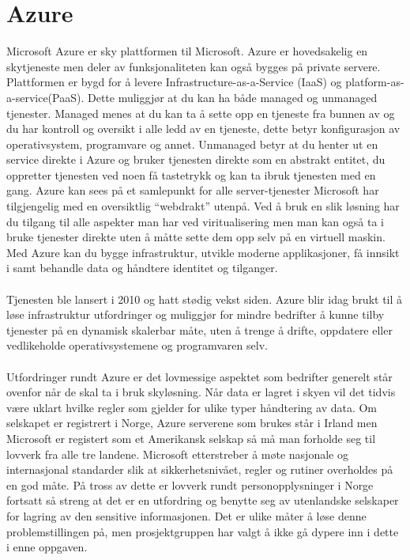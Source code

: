 \section{Azure}
\label{sec:teoridel_azure}
Microsoft Azure er sky plattformen til Microsoft. Azure er hovedsakelig en skytjeneste men deler av funksjonaliteten kan også bygges på private servere. Plattformen er bygd for å levere Infrastructure-as-a-Service (IaaS) og platform-as-a-service(PaaS). Dette muliggjør at du kan ha både managed og unmanaged tjenester. Managed menes at du kan ta å sette opp en tjeneste fra bunnen av og du har kontroll og oversikt i alle ledd av en tjeneste, dette betyr konfigurasjon av operativsystem, programvare og annet. Unmanaged betyr at du henter ut en service direkte i Azure og bruker tjenesten direkte som en abstrakt entitet, du oppretter tjenesten ved noen få tastetrykk og kan ta ibruk tjenesten med en gang. Azure kan sees på et samlepunkt for alle server-tjenester Microsoft har tilgjengelig med en oversiktlig “webdrakt” utenpå. Ved å bruk en slik løsning har du tilgang til alle aspekter man har ved viritualisering men man kan også ta i bruke tjenester direkte uten å måtte sette dem opp selv på en virtuell maskin. Med Azure kan du bygge infrastruktur, utvikle moderne applikasjoner, få innsikt i samt behandle data og håndtere identitet og tilganger. 
\\
\\
Tjenesten ble lansert i 2010 og hatt stødig vekst siden\cite{AzureLansert}. Azure blir idag brukt til å løse infrastruktur utfordringer og muliggjør for mindre bedrifter å kunne tilby tjenester på en dynamisk skalerbar måte, uten å trenge å drifte, oppdatere eller vedlikeholde operativsystemene og programvaren selv. 
\\
\\
Utfordringer rundt Azure er det lovmessige aspektet som bedrifter generelt står ovenfor når de skal ta i bruk skyløsning. Når data er lagret i skyen vil det tidvis være uklart hvilke regler som gjelder for ulike typer håndtering av data. Om selskapet er registrert i Norge, Azure serverene som brukes står i Irland men Microsoft er registert som et Amerikansk selskap så må man forholde seg til lovverk fra alle tre landene. Microsoft etterstreber å møte nasjonale og internasjonal standarder slik at sikkerhetsnivået, regler og rutiner overholdes på en god måte\cite{AzurePrivacy}. På tross av dette er lovverk rundt personopplysninger i Norge fortsatt så streng at det er en utfordring og benytte seg av utenlandske selskaper for lagring av den sensitive informasjonen. Det er ulike måter å løse denne problemstillingen på, men prosjektgruppen har valgt å ikke gå dypere inn i dette i enne oppgaven.

